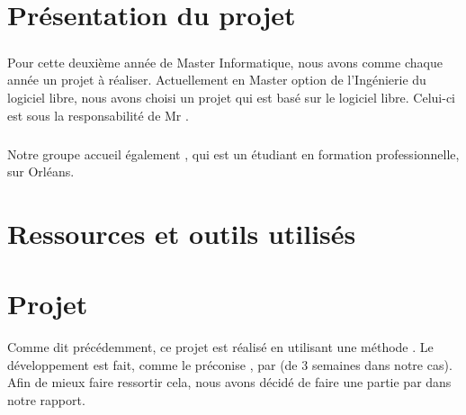 \documentclass[french]{report}
\begin{document}
\chapter{Présentation du projet}
\paragraph{}Pour cette deuxième année de Master Informatique, nous avons comme chaque année un projet à réaliser. Actuellement en Master option de l'Ingénierie du logiciel libre, nous avons choisi un projet qui est basé sur le logiciel libre. Celui-ci est sous la responsabilité de Mr \responsableProjet.
\paragraph{}Notre groupe accueil également \etudiantSL, qui est un étudiant en formation professionnelle, sur Orléans.



\chapter{Ressources et outils utilisés}



\chapter{Projet}
Comme dit précédemment, ce projet est réalisé en utilisant une méthode \agile{}. Le développement est fait, comme le préconise \scrum{}, par \sprint{} (de 3 semaines dans notre cas). Afin de mieux faire ressortir cela, nous avons décidé de faire une partie par \sprint{} dans notre rapport.
\end{document}
